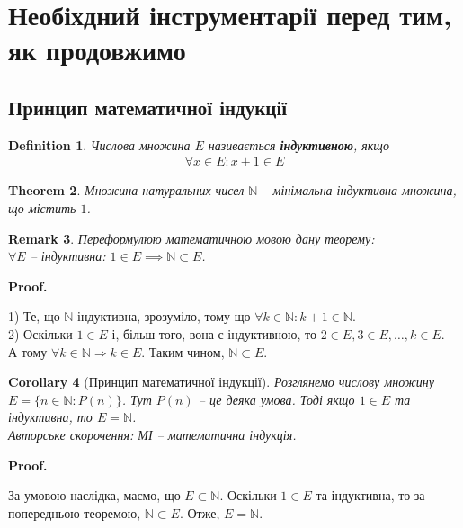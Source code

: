 \documentclass[a4paper, 14pt]{article}
\makeatletter
\def\qed{$\blacksquare$}
\theoremstyle{theoremdd}
\newtheorem{theorem}{Theorem}[subsection]
\theoremstyle{theoremdd}
\newtheorem{definition}[theorem]{Definition}
\theoremstyle{theoremdd}
\theoremstyle{theoremdd}
\theoremstyle{theoremdd}
\theoremstyle{theoremdd}
\newtheorem{remark}[theorem]{Remark}
\theoremstyle{theoremdd}
\theoremstyle{theoremdd}
\newtheorem{corollary}[theorem]{Corollary}
\renewenvironment{proof}[1][Proof.\\]{\par
\pushQED{\hfill \qed}%
\normalfont \topsep6\p@\@plus6\p@\relax
\trivlist
\item\relax
{\bfseries
#1\@addpunct{.}}\hspace\labelsep\ignorespaces
}{%
\popQED\endtrivlist\@endpefalse
}
\makeatother
\begin{document}
	\section*{Необіхдний інструментарії перед тим, як продовжимо}
	\subsection*{Принцип математичної індукції}
	\begin{definition}
	Числова множина $E$ називається \textbf{індуктивною}, якщо
	\begin{align*}
		\forall x \in E: x+1 \in E
	\end{align*}
	\end{definition}
	
	\begin{theorem}
	Множина натуральних чисел $\mathbb{N}$ -- мінімальна індуктивна множина, що містить $1$.
	\end{theorem}
	
	\begin{remark}
	Переформулюю математичною мовою дану теорему:\\
	$\forall E$ -- індуктивна: $1 \in E \implies \mathbb{N} \subset E$.
	\end{remark}
	
	\begin{proof}
	1) Те, що $\mathbb{N}$ індуктивна, зрозуміло, тому що $\forall k \in \mathbb{N}: k+1 \in \mathbb{N}$.\\
	2) Оскільки $1 \in E$ і, більш того, вона є індуктивною, то $2 \in E, 3 \in E, \dots, k \in E$.\\
	А тому $\forall k \in \mathbb{N} \Rightarrow k \in E$. Таким чином, $\mathbb{N} \subset E$.
	\end{proof}
	
	\begin{corollary}[Принцип математичної індукції]
	Розглянемо числову множину $E = \{n \in \mathbb{N}: P(n)\}$. Тут $P(n)$ -- це деяка умова. Тоді якщо $1 \in E$ та індуктивна, то $E = \mathbb{N}$.\\
	Авторське скорочення: МІ -- математична індукція.
	\end{corollary}
	
	\begin{proof}
	За умовою наслідка, маємо, що $E \subset \mathbb{N}$. Оскільки $1 \in E$ та індуктивна, то за попередньою теоремою, $\mathbb{N} \subset E$. Отже, $E = \mathbb{N}$.
	\end{proof}
	
\end{document}
